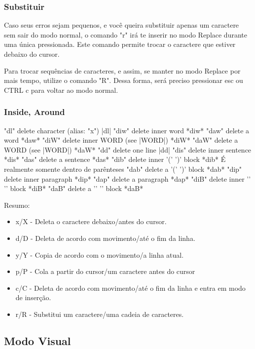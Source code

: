 \documentclass[a4paper, 12pt]{article}
\begin{document}
\subsubsection{Substituir}
Caso seus erros sejam pequenos, e você queira substituir apenas um caractere sem sair do modo normal, o comando "r" irá te inserir no modo Replace durante uma única pressionada.
Este comando permite trocar o caractere que estiver debaixo do cursor.

Para trocar sequências de caracteres, e assim, se manter no modo Replace por mais tempo, utilize o comando "R".
Dessa forma, será preciso pressionar esc ou CTRL c para voltar ao modo normal.

\subsubsection{Inside, Around}
	"dl"	delete character (alias: "x")		|dl|
	"diw"	delete inner word			*diw*
	"daw"	delete a word				*daw*
	"diW"	delete inner WORD (see |WORD|)		*diW*
	"daW"	delete a WORD (see |WORD|)		*daW*
	"dd"	delete one line				|dd|
	"dis"	delete inner sentence			*dis*
	"das"	delete a sentence			*das*
	"dib"	delete inner '(' ')' block		*dib* É realmente somente dentro de parênteses
	"dab"	delete a '(' ')' block			*dab*
	"dip"	delete inner paragraph			*dip*
	"dap"	delete a paragraph			*dap*
	"diB"	delete inner '{' '}' block		*diB*
	"daB"	delete a '{' '}' block			*daB*

Resumo:
\begin{itemize}
    \item x/X - Deleta o caractere debaixo/antes do cursor.
    \item d/D - Deleta de acordo com movimento/até o fim da linha.
    \item y/Y - Copia de acordo com o movimento/a linha atual.
    \item p/P - Cola a partir do cursor/um caractere antes do cursor
    \item c/C - Deleta de acordo com movimento/até o fim da linha e entra em modo de inserção.
    \item r/R - Substitui um caractere/uma cadeia de caracteres.
\end{itemize}

\subsection{Modo Visual}
\end{document}
